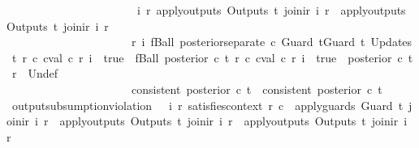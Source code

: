 \begin{isabellebody}
\ \ \ \ \ \ \ \ \ \ \ \ \ \ \ \ \ \ \ \ \ \ {\isacharparenleft}{\isasymexists}\ i\ r{\isachardot}\ apply{\isacharunderscore}outputs\ {\isacharparenleft}Outputs\ t{}{\isacharparenright}\ {\isacharparenleft}join{\isacharunderscore}ir\ i\ r{\isacharparenright}\ {\isacharequal}\ apply{\isacharunderscore}outputs\ {\isacharparenleft}Outputs\ t{}{\isacharparenright}\ {\isacharparenleft}join{\isacharunderscore}ir\ i\ r{\isacharparenright}{\isacharparenright}\ {\isasymand}\isanewline
\ \ \ \ \ \ \ \ \ \ \ \ \ \ \ \ \ \ \ \ \ \ {\isacharparenleft}{\isasymforall}r\ i{\isachardot}\ fBall\ {\isacharparenleft}posterior{\isacharunderscore}separate\ c\ {\isacharparenleft}Guard\ t{}{\isacharat}Guard\ t{}{\isacharparenright}\ {\isacharparenleft}Updates\ t{}{\isacharparenright}\ r{\isacharparenright}\ {\isacharparenleft}{\isasymlambda}c{\isachardot}\ cval\ c\ r\ i\ {\isacharequal}\ true{\isacharparenright}\ {\isasymlongrightarrow}\ fBall\ {\isacharparenleft}posterior\ c\ t{}\ r{\isacharparenright}\ {\isacharparenleft}{\isasymlambda}c{\isachardot}\ cval\ c\ r\ i\ {\isacharequal}\ true{\isacharparenright}\ {\isasymor}\ {\isacharparenleft}posterior\ c\ t{}\ r{\isacharparenright}\ {\isacharequal}\ {\isacharbraceleft}{\isacharbar}Undef{\isacharbar}{\isacharbraceright}{\isacharparenright}\ {\isasymand}\isanewline
\ \ \ \ \ \ \ \ \ \ \ \ \ \ \ \ \ \ \ \ \ \ {\isacharparenleft}consistent\ {\isacharparenleft}posterior\ c\ t{}{\isacharparenright}\ {\isasymlongrightarrow}\ consistent\ {\isacharparenleft}posterior\ c\ t{}{\isacharparenright}{\isacharparenright}{\isachardoublequoteclose}\isanewline
\isanewline
{}\isamarkupfalse%
\ output{\isacharunderscore}subsumption{\isacharunderscore}violation{\isacharcolon}\ {\isachardoublequoteopen}{\isasymnot}\ {\isacharparenleft}{\isasymforall}\ i\ r{\isachardot}\ satisfies{\isacharunderscore}context\ r\ c\ {\isasymlongrightarrow}\ apply{\isacharunderscore}guards\ {\isacharparenleft}Guard\ t{}{\isacharparenright}\ {\isacharparenleft}join{\isacharunderscore}ir\ i\ r{\isacharparenright}\ {\isasymlongrightarrow}\ apply{\isacharunderscore}outputs\ {\isacharparenleft}Outputs\ t{}{\isacharparenright}\ {\isacharparenleft}join{\isacharunderscore}ir\ i\ r{\isacharparenright}\ {\isacharequal}\ apply{\isacharunderscore}outputs\ {\isacharparenleft}Outputs\ t{}{\isacharparenright}\ {\isacharparenleft}join{\isacharunderscore}ir\ i\ r{\isacharparenright}{\isacharparenright}\ {\isasymLongrightarrow}\isanewline

\end{isabellebody}
